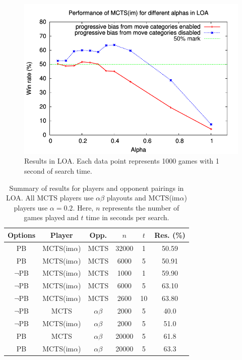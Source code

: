 \documentclass[conference]{IEEEtran}
\begin{document}
\begin{figure}[t]
\begin{center}
\includegraphics[scale=0.7]{plots/loa-alpha}
\caption{Results in LOA. Each data point represents 1000 games with 1 second of search time. } 
\label{fig:loa-alpha}
\end{center}
\end{figure}

\begin{table}[t]
\begin{center}
\begin{tabular}{ccccc|c}
Options & Player        & Opp. & $n$ & $t$ & Res. (\%) \\
\hline
\hline
PB      & MCTS(im$\alpha$) & MCTS     & 32000 & 1        & 50.59       \\
PB      & MCTS(im$\alpha$) & MCTS     & 6000  & 5        & 50.91       \\
\hline
$\neg$PB & MCTS(im$\alpha$) & MCTS & 1000 & 1  & 59.90       \\
$\neg$PB & MCTS(im$\alpha$) & MCTS & 6000 & 5  & 63.10       \\
$\neg$PB & MCTS(im$\alpha$) & MCTS & 2600 & 10 & 63.80       \\
\hline
$\neg$PB & MCTS             & $\alpha \beta$ & 2000 & 5  & 40.0       \\
$\neg$PB & MCTS(im$\alpha$) & $\alpha \beta$ & 2000 & 5 & 51.0       \\
\hline
PB       & MCTS             & $\alpha \beta$ & 20000 & 5  & 61.8       \\
PB       & MCTS(im$\alpha$) & $\alpha \beta$ & 20000 & 5  & 63.3       \\
\hline
\end{tabular}
\end{center}
\caption{Summary of results for players and opponent pairings in LOA. 
All MCTS players use $\alpha \beta$ playouts and MCTS(im$\alpha$) players use $\alpha = 0.2$. 
Here, $n$ represents the number of games played and $t$ time in seconds per search.}
\label{tbl:loaresults}
\end{table}
\end{document}
